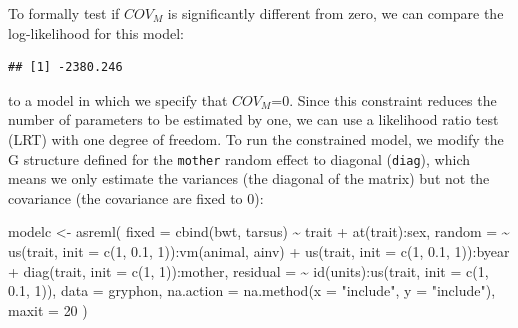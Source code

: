 \documentclass[
  12pt,
]{book}
\newenvironment{Shaded}{\begin{snugshade}}{\end{snugshade}}
\newcommand{\AttributeTok}[1]{\textcolor[rgb]{0.77,0.63,0.00}{#1}}
\newcommand{\DecValTok}[1]{\textcolor[rgb]{0.00,0.00,0.81}{#1}}
\newcommand{\FloatTok}[1]{\textcolor[rgb]{0.00,0.00,0.81}{#1}}
\newcommand{\FunctionTok}[1]{\textcolor[rgb]{0.00,0.00,0.00}{#1}}
\newcommand{\NormalTok}[1]{#1}
\newcommand{\OtherTok}[1]{\textcolor[rgb]{0.56,0.35,0.01}{#1}}
\newcommand{\SpecialCharTok}[1]{\textcolor[rgb]{0.00,0.00,0.00}{#1}}
\newcommand{\StringTok}[1]{\textcolor[rgb]{0.31,0.60,0.02}{#1}}
\begin{document}
To formally test if \(COV_M\) is significantly different from zero, we can compare the log-likelihood for this model:

\begin{Shaded}
\end{Shaded}

\begin{verbatim}
## [1] -2380.246
\end{verbatim}

to a model in which we specify that \(COV_M\)=0. Since this constraint reduces the number of parameters to be estimated by one, we can use a likelihood ratio test (LRT) with one degree of freedom. To run the constrained model, we modify the G structure defined for the \texttt{mother} random effect to diagonal (\texttt{diag}), which means we only estimate the variances (the diagonal of the matrix) but not the covariance (the covariance are fixed to 0):

\begin{Shaded}
\begin{Highlighting}[]
\NormalTok{modelc }\OtherTok{\textless{}{-}} \FunctionTok{asreml}\NormalTok{(}
  \AttributeTok{fixed =} \FunctionTok{cbind}\NormalTok{(bwt, tarsus) }\SpecialCharTok{\textasciitilde{}}\NormalTok{ trait }\SpecialCharTok{+} \FunctionTok{at}\NormalTok{(trait)}\SpecialCharTok{:}\NormalTok{sex,}
  \AttributeTok{random =} \SpecialCharTok{\textasciitilde{}} \FunctionTok{us}\NormalTok{(trait, }\AttributeTok{init =} \FunctionTok{c}\NormalTok{(}\DecValTok{1}\NormalTok{, }\FloatTok{0.1}\NormalTok{, }\DecValTok{1}\NormalTok{))}\SpecialCharTok{:}\FunctionTok{vm}\NormalTok{(animal, ainv) }\SpecialCharTok{+}
    \FunctionTok{us}\NormalTok{(trait, }\AttributeTok{init =} \FunctionTok{c}\NormalTok{(}\DecValTok{1}\NormalTok{, }\FloatTok{0.1}\NormalTok{, }\DecValTok{1}\NormalTok{))}\SpecialCharTok{:}\NormalTok{byear }\SpecialCharTok{+}
    \FunctionTok{diag}\NormalTok{(trait, }\AttributeTok{init =} \FunctionTok{c}\NormalTok{(}\DecValTok{1}\NormalTok{, }\DecValTok{1}\NormalTok{))}\SpecialCharTok{:}\NormalTok{mother,}
  \AttributeTok{residual =} \SpecialCharTok{\textasciitilde{}} \FunctionTok{id}\NormalTok{(units)}\SpecialCharTok{:}\FunctionTok{us}\NormalTok{(trait, }\AttributeTok{init =} \FunctionTok{c}\NormalTok{(}\DecValTok{1}\NormalTok{, }\FloatTok{0.1}\NormalTok{, }\DecValTok{1}\NormalTok{)),}
  \AttributeTok{data =}\NormalTok{ gryphon,}
  \AttributeTok{na.action =} \FunctionTok{na.method}\NormalTok{(}\AttributeTok{x =} \StringTok{"include"}\NormalTok{, }\AttributeTok{y =} \StringTok{"include"}\NormalTok{),}
  \AttributeTok{maxit =} \DecValTok{20}
\NormalTok{)}
\end{Highlighting}
\end{Shaded}
\end{document}
